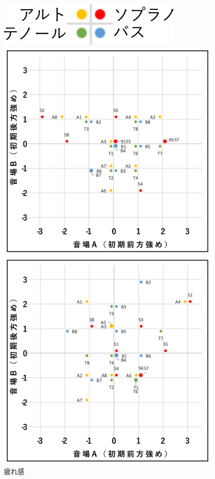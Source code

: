 \documentclass[11pt,a4j]{jreport}
\begin{document}
\begin{figure}[H]
  \begin{minipage}{1\linewidth}
    \centering
    \includegraphics[scale=.7]{images/subjectiveExp/scat_0_legend.jpg}
  \end{minipage}

  \begin{minipage}{0.5\linewidth}
    \centering
    \includegraphics[width=.9\linewidth]{images/subjectiveExp/scat_early_08tiredness.png}
    \caption*{疲れ感}
  \end{minipage}%
  \begin{minipage}{0.5\linewidth}
    \centering
    \includegraphics[width=.9\linewidth]{images/subjectiveExp/scat_early_09dynamics.png}

\end{minipage}
\end{figure}
\end{document}
